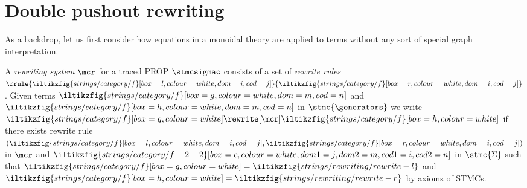 \section{Double pushout rewriting}

As a backdrop, let us first consider how equations in a monoidal theory are
applied to terms without any sort of special graph interpretation.

\begin{definition}\label{def:term-rewriting}
    A \emph{rewriting system} \(\mcr\) for a traced PROP \(\stmcsigmac\)
    consists of a set of \emph{rewrite rules} \(
        \rrule{
            \iltikzfig{strings/category/f}[box=l,colour=white,dom=i,cod=j]
        }{
            \iltikzfig{strings/category/f}[box=r,colour=white,dom=i,cod=j]
        }
    \).
    Given terms \(
        \iltikzfig{strings/category/f}[box=g,colour=white,dom=m,cod=n]
    \) and \(
        \iltikzfig{strings/category/f}[box=h,colour=white,dom=m,cod=n]
    \) in \(\stmc{\generators}\) we write \(
        \iltikzfig{strings/category/f}[box=g,colour=white]
        \rewrite[\mcr]
        \iltikzfig{strings/category/f}[box=h,colour=white]
    \) if there exists rewrite rule \((
        \iltikzfig{strings/category/f}[box=l,colour=white,dom=i,cod=j],
        \iltikzfig{strings/category/f}[box=r,colour=white,dom=i,cod=j]
    )\) in \(\mcr\) and \(
        \iltikzfig{strings/category/f-2-2}[box=c,colour=white,dom1=j,dom2=m,cod1=i,cod2=n]
    \) in \(\stmc{\Sigma}\) such that \(
        \iltikzfig{strings/category/f}[box=g,colour=white]
        =
        \iltikzfig{strings/rewriting/rewrite-l}
    \) and \(
        \iltikzfig{strings/category/f}[box=h,colour=white]
        =
        \iltikzfig{strings/rewriting/rewrite-r}
    \) by axioms of STMCs.
\end{definition}
